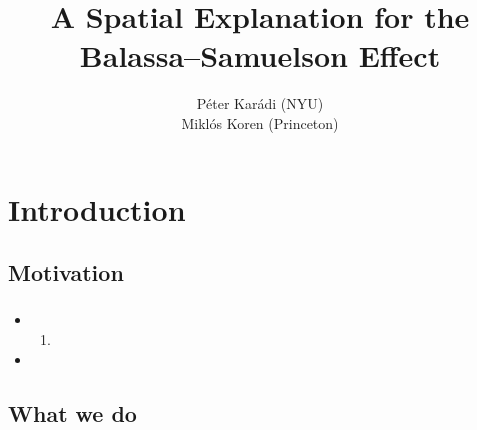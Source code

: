 \documentclass[compress,mathserif]{beamer}
\title[Balassa--Samuelson]%
{A Spatial Explanation for the Balassa--Samuelson Effect}
\author[Kar\'adi and Koren] %
{P\'eter Kar\'adi (NYU)\\
Mikl\'os Koren (Princeton)}
\date %
{}
\newcounter{perc}
\newcounter{percek}
\begin{document}
\begin{frame}[plain]
  \titlepage
    \addtocounter{framenumber}{-1}
\end{frame}

\section{Introduction}
\subsection{Motivation}
\begin{frame}\frametitle{}

\begin{itemize}[<+->]
	\item 
	\begin{enumerate}[<+->]
		\item 
	\end{enumerate}
	\item 
\end{itemize}
\end{frame}




\addtocounter{percek}{9}

\subsection{What we do}
\end{document}
